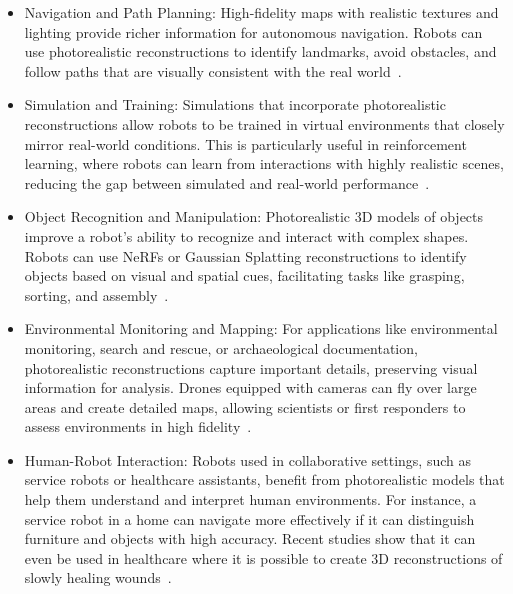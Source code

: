 \begin{itemize}
    \item Navigation and Path Planning: High-fidelity maps with realistic textures and lighting provide richer information for autonomous navigation. Robots can use photorealistic reconstructions to identify landmarks, avoid obstacles, and follow paths that are visually consistent with the real world~\cite{active_splat}.
    \item Simulation and Training: Simulations that incorporate photorealistic reconstructions allow robots to be trained in virtual environments that closely mirror real-world conditions. This is particularly useful in reinforcement learning, where robots can learn from interactions with highly realistic scenes, reducing the gap between simulated and real-world performance~\cite{reinforcement_learning_robot}.
    \item Object Recognition and Manipulation: Photorealistic 3D models of objects improve a robot's ability to recognize and interact with complex shapes. Robots can use NeRFs or Gaussian Splatting reconstructions to identify objects based on visual and spatial cues, facilitating tasks like grasping, sorting, and assembly~\cite{frodo}.
    \item Environmental Monitoring and Mapping: For applications like environmental monitoring, search and rescue, or archaeological documentation, photorealistic reconstructions capture important details, preserving visual information for analysis. Drones equipped with cameras can fly over large areas and create detailed maps, allowing scientists or first responders to assess environments in high fidelity~\cite{drone_3d_reconstruction}.
    \item Human-Robot Interaction: Robots used in collaborative settings, such as service robots or healthcare assistants, benefit from photorealistic models that help them understand and interpret human environments. For instance, a service robot in a home can navigate more effectively if it can distinguish furniture and objects with high accuracy. Recent studies show that it can even be used in healthcare where it is possible to create 3D reconstructions of slowly healing wounds~\cite{3d_reconstruction_wounds}.
\end{itemize}
